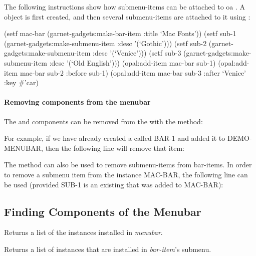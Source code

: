 The following instructions show how submenu-items can be attached to
oa .  A  object is first created, and then several
submenu-items are attached to it using :
\begin{programexample}
(setf mac-bar (garnet-gadgets:make-bar-item :title `Mac Fonts'))
(setf sub-1 (garnet-gadgets:make-submenu-item :desc '(`Gothic')))
(setf sub-2 (garnet-gadgets:make-submenu-item :desc '(`Venice')))
(setf sub-3 (garnet-gadgets:make-submenu-item :desc '(`Old English')))
(opal:add-item mac-bar sub-1)
(opal:add-item mac-bar sub-2 :before sub-1)
(opal:add-item mac-bar sub-3 :after `Venice' :key \#'car)
\end{programexample}


\paragraph{Removing components from the menubar}

The  and  components can be removed from the
 with the  method:


For example, if we have already created a  called BAR-1 and added
it to DEMO-MENUBAR, then the following line will remove that item:

The  method can also be used to remove submenu-items from
bar-items.  In order to remove a submenu item from the 
instance MAC-BAR, the following line can be used (provided SUB-1 is an
existing  that was added to MAC-BAR):



\subsection{Finding Components of the Menubar}

Returns a list of the  instances installed in {\it menubar}.

Returns a list of  instances that are installed in
{\it bar-item}'s submenu.


